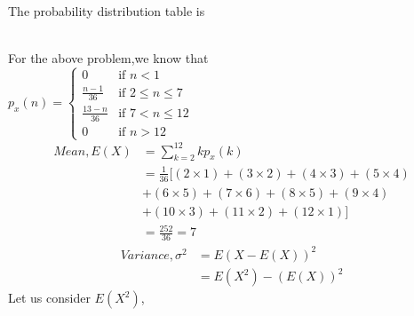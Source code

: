 \documentclass[journal,12pt,twocolumn]{IEEEtran}
\begin{document}
The probability distribution table is 
\renewcommand{\arraystretch}{2}
\begin{table}[hbt!]
\end{table}\\
For the above problem,we know that\\
$p_x(n) = 
\left\{
	\begin{array}{ll}
		0  & \mbox{if } n < 1 \\
		\displaystyle\frac{n-1}{36} & \mbox{if } 2\leq n \leq 7\\
		\displaystyle\frac{13-n}{36} & \mbox{if } 7<n \leq 12\\
		0 & \mbox{if } n > 12
	\end{array}
\right.$
\begin{align}
    Mean,E(X)& =\sum_{k=2}^{12} kp_x(k)\\
    & = \displaystyle\frac{1}{36}[(2\times1)+(3\times2)+(4\times3)+(5\times4)\\
    &+(6\times5)+(7\times6)+(8\times5)+(9\times4)\\
    &+(10\times3)+(11\times2)+(12\times1)]\\
    & = \frac{252}{36}=7
\end{align} 
\begin{align}
    Variance,\sigma^2 &= E(X-E(X))^2\\
    &= E(X^2) - (E(X))^2
\end{align}
Let us consider $E(X^2)$,
\end{document}
